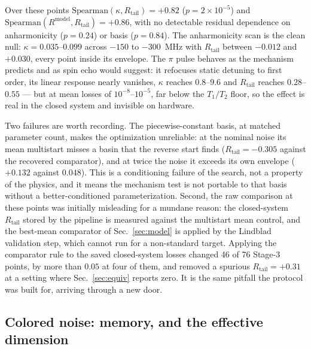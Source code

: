 \documentclass[aps,pra,twocolumn,superscriptaddress,reprint,nofootinbib,floatfix]{revtex4-2}
\theoremstyle{definition}
\newcommand{\Rt}{R_{\mathrm{tail}}}
\newcommand{\Rm}{R^{\mathrm{model}}}
\begin{document}
Over these points $\mathrm{Spearman}(\kappa,\Rt)=+0.82$ ($p=2\times10^{-5}$)
and $\mathrm{Spearman}(\Rm,\Rt)=+0.86$, with no detectable residual dependence
on anharmonicity ($p=0.24$) or basis ($p=0.84$). The anharmonicity scan is
the clean null: $\kappa=0.035$--$0.099$ across $-150$ to $-300$~MHz with
$\Rt$ between $-0.012$ and $+0.030$, every point inside its envelope. The
$\pi$ pulse behaves as the mechanism predicts and as spin echo would suggest:
it refocuses static detuning to first order, its linear response nearly
vanishes, $\kappa$ reaches $0.8$--$9.6$ and $\Rt$ reaches $0.28$--$0.55$ ---
but at mean losses of $10^{-8}$--$10^{-5}$, far below the $T_1/T_2$ floor,
so the effect is real in the closed system and invisible on hardware.

Two failures are worth recording. The piecewise-constant basis, at matched
parameter count, makes the optimization unreliable: at the nominal noise its
mean multistart misses a basin that the reverse start finds
($\Rt=-0.305$ against the recovered comparator), and at twice the noise it
exceeds its own envelope ($+0.132$ against $0.048$). This is a conditioning
failure of the search, not a property of the physics, and it means the
mechanism test is not portable to that basis without a better-conditioned
parameterization. Second, the raw comparison at these points was initially
misleading for a mundane reason: the closed-system $\Rt$ stored by the
pipeline is measured against the multistart mean control, and the
best-mean comparator of Sec.~\ref{sec:model} is applied by the Lindblad
validation step, which cannot run for a non-standard target. Applying the
comparator rule to the saved closed-system losses changed 46 of 76 Stage-3
points, by more than $0.05$ at four of them, and removed a spurious
$\Rt=+0.31$ at a setting where Sec.~\ref{sec:equiv} reports zero. It is the
same pitfall the protocol was built for, arriving through a new door.

\subsection{Colored noise: memory, and the effective dimension}
\label{sec:colored}
\end{document}
